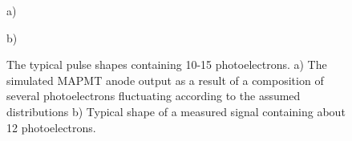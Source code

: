 \documentclass{webofc}
\begin{document}
\begin{figure}[h]
	\begin{minipage}[h]{0.45\linewidth}
		 a) \\
	\end{minipage}
	\hfill
	\begin{minipage}[h]{0.45\linewidth}
		 b) \\
	\end{minipage}
	\caption{ The typical pulse shapes containing 10-15 photoelectrons. a) The simulated MAPMT anode output as a result of a composition of several photoelectrons fluctuating according to the assumed distributions  b) Typical shape of a measured signal containing about 12 photoelectrons.}
	\label{ris:sim}
\end{figure}
\end{document}
